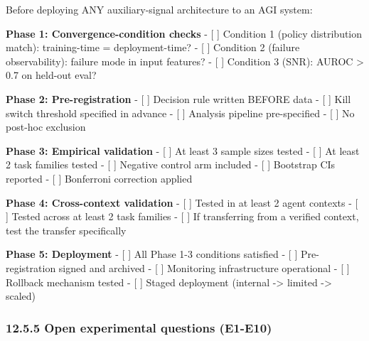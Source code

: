 \documentclass[
]{article}
\begin{document}
Before deploying ANY auxiliary-signal architecture to an AGI system:

\textbf{Phase 1: Convergence-condition checks} - {[} {]} Condition 1
(policy distribution match): training-time = deployment-time? - {[} {]}
Condition 2 (failure observability): failure mode in input features? -
{[} {]} Condition 3 (SNR): AUROC \textgreater{} 0.7 on held-out eval?

\textbf{Phase 2: Pre-registration} - {[} {]} Decision rule written
BEFORE data - {[} {]} Kill switch threshold specified in advance - {[}
{]} Analysis pipeline pre-specified - {[} {]} No post-hoc exclusion

\textbf{Phase 3: Empirical validation} - {[} {]} At least 3 sample sizes
tested - {[} {]} At least 2 task families tested - {[} {]} Negative
control arm included - {[} {]} Bootstrap CIs reported - {[} {]}
Bonferroni correction applied

\textbf{Phase 4: Cross-context validation} - {[} {]} Tested in at least
2 agent contexts - {[} {]} Tested across at least 2 task families - {[}
{]} If transferring from a verified context, test the transfer
specifically

\textbf{Phase 5: Deployment} - {[} {]} All Phase 1-3 conditions
satisfied - {[} {]} Pre-registration signed and archived - {[} {]}
Monitoring infrastructure operational - {[} {]} Rollback mechanism
tested - {[} {]} Staged deployment (internal -\textgreater{} limited
-\textgreater{} scaled)

\subsubsection{12.5.5 Open experimental questions
(E1-E10)}\label{open-experimental-questions-e1-e10}
\end{document}
